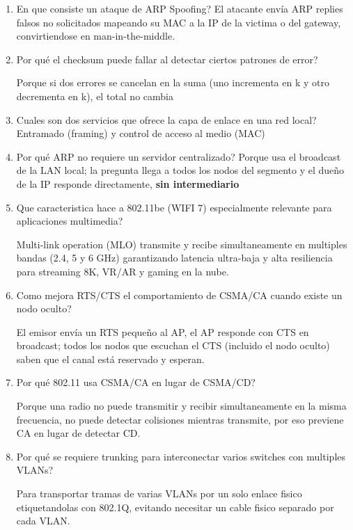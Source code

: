 \begin{enumerate}
\item En que consiste un ataque de ARP Spoofing?
El atacante envía ARP replies falsos no solicitados mapeando su MAC a la IP de la victima o del gateway, convirtiendose en man-in-the-middle.

\item Por qué el checksum puede fallar al detectar ciertos patrones de error?

Porque si dos errores se cancelan en la suma (uno incrementa en k y otro decrementa en k), el total no cambia

\item Cuales son dos servicios que ofrece la capa de enlace en una red local?
Entramado (framing) y control de acceso al medio (MAC)

\item Por qué ARP no requiere un servidor centralizado?
Porque usa el broadcast de la LAN local; la pregunta llega a todos los nodos del segmento y el dueño de la IP responde directamente, \textbf{sin intermediario}

\item Que caracteristica hace a 802.11be (WIFI 7) especialmente relevante para aplicaciones multimedia?

Multi-link operation (MLO) transmite y recibe simultaneamente en multiples bandas (2.4, 5 y 6 GHz) garantizando latencia ultra-baja y alta resiliencia para streaming 8K, VR/AR y gaming en la nube.

\item Como mejora RTS/CTS el comportamiento de CSMA/CA cuando existe un nodo oculto?

El emisor envía un RTS pequeño al AP, el AP responde con CTS en broadcast; todos los nodos que escuchan el CTS (incluido el nodo oculto) saben que el canal está reservado y esperan.

\item Por qué 802.11 usa CSMA/CA en lugar de CSMA/CD?

Porque una radio no puede transmitir y recibir simultaneamente en la misma frecuencia, no puede detectar colisiones mientras transmite, por eso previene CA en lugar de detectar CD.

\item Por qué se requiere trunking para interconectar varios switches con multiples VLANs?

Para transportar tramas de varias VLANs por un solo enlace fisico etiquetandolas con 802.1Q, evitando necesitar un cable fisico separado por cada VLAN.


\end{enumerate}
